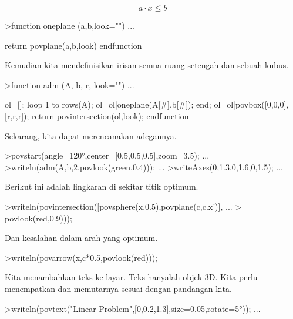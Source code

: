 \documentclass[a4paper,10pt]{article}
\begin{document}
\begin{eulernotebook}
\begin{eulercomment}
\begin{eulercomment}
\begin{eulercomment}
\begin{eulercomment}
\begin{eulercomment}
\begin{eulercomment}
\begin{eulercomment}
\begin{eulercomment}
\begin{eulercomment}
\begin{eulercomment}
\begin{eulercomment}
\begin{eulercomment}
\begin{eulercomment}
\begin{eulercomment}
\begin{eulercomment}
\begin{eulercomment}
\begin{eulercomment}
\end{eulercomment}
\begin{eulerformula}
\[
a \cdot x \le b
\]
\end{eulerformula}
\begin{eulerprompt}
>function oneplane (a,b,look="") ...
\end{eulerprompt}
\begin{eulerudf}
    return povplane(a,b,look)
  endfunction
\end{eulerudf}
\begin{eulercomment}
Kemudian kita mendefinisikan irisan semua ruang setengah dan sebuah
kubus.
\end{eulercomment}
\begin{eulerprompt}
>function adm (A, b, r, look="") ...
\end{eulerprompt}
\begin{eulerudf}
    ol=[];
    loop 1 to rows(A); ol=ol|oneplane(A[#],b[#]); end;
    ol=ol|povbox([0,0,0],[r,r,r]);
    return povintersection(ol,look);
  endfunction
\end{eulerudf}
\begin{eulercomment}
Sekarang, kita dapat merencanakan adegannya.
\end{eulercomment}
\begin{eulerprompt}
>povstart(angle=120°,center=[0.5,0.5,0.5],zoom=3.5); ...
>writeln(adm(A,b,2,povlook(green,0.4))); ...
>writeAxes(0,1.3,0,1.6,0,1.5); ...
\end{eulerprompt}
\begin{eulercomment}
Berikut ini adalah lingkaran di sekitar titik optimum.
\end{eulercomment}
\begin{eulerprompt}
>writeln(povintersection([povsphere(x,0.5),povplane(c,c.x')], ...
>  povlook(red,0.9)));
\end{eulerprompt}
\begin{eulercomment}
Dan kesalahan dalam arah yang optimum.
\end{eulercomment}
\begin{eulerprompt}
>writeln(povarrow(x,c*0.5,povlook(red)));
\end{eulerprompt}
\begin{eulercomment}
Kita menambahkan teks ke layar. Teks hanyalah objek 3D. Kita perlu
menempatkan dan memutarnya sesuai dengan pandangan kita.
\end{eulercomment}
\begin{eulerprompt}
>writeln(povtext("Linear Problem",[0,0.2,1.3],size=0.05,rotate=5°)); ...

\end{eulerprompt}
\end{eulercomment}
\end{eulercomment}
\end{eulercomment}
\end{eulercomment}
\end{eulercomment}
\end{eulercomment}
\end{eulercomment}
\end{eulercomment}
\end{eulercomment}
\end{eulercomment}
\end{eulercomment}
\end{eulercomment}
\end{eulercomment}
\end{eulercomment}
\end{eulercomment}
\end{eulercomment}
\end{eulernotebook}
\end{document}
